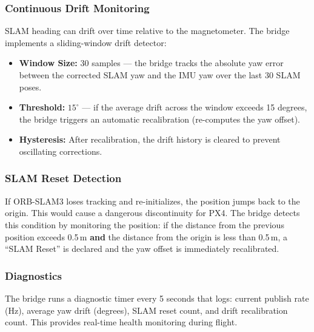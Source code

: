 \subsubsection{Continuous Drift Monitoring}
SLAM heading can drift over time relative to the magnetometer. The bridge implements a sliding-window drift detector:
\begin{itemize}
    \item \textbf{Window Size:} 30 samples --- the bridge tracks the absolute yaw error between the corrected SLAM yaw and the IMU yaw over the last 30 SLAM poses.
    \item \textbf{Threshold:} $15^\circ$ --- if the average drift across the window exceeds 15 degrees, the bridge triggers an automatic recalibration (re-computes the yaw offset).
    \item \textbf{Hysteresis:} After recalibration, the drift history is cleared to prevent oscillating corrections.
\end{itemize}

\subsubsection{SLAM Reset Detection}
If ORB-SLAM3 loses tracking and re-initializes, the position jumps back to the origin. This would cause a dangerous discontinuity for PX4. The bridge detects this condition by monitoring the position: if the distance from the previous position exceeds 0.5\,m \textbf{and} the distance from the origin is less than 0.5\,m, a ``SLAM Reset'' is declared and the yaw offset is immediately recalibrated.

\subsubsection{Diagnostics}
The bridge runs a diagnostic timer every 5 seconds that logs: current publish rate (Hz), average yaw drift (degrees), SLAM reset count, and drift recalibration count. This provides real-time health monitoring during flight.

